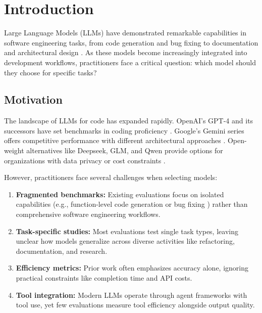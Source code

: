 \section{Introduction}
\label{sec:intro}

Large Language Models (LLMs) have demonstrated remarkable capabilities in software engineering tasks, from code generation and bug fixing to documentation and architectural design \cite{chen2021evaluating, jimenez2023swe}. As these models become increasingly integrated into development workflows, practitioners face a critical question: which model should they choose for specific tasks?

\subsection{Motivation}

The landscape of LLMs for code has expanded rapidly. OpenAI's GPT-4 and its successors have set benchmarks in coding proficiency \cite{openai2024gpt4}. Google's Gemini series offers competitive performance with different architectural approaches \cite{gemini2024}. Open-weight alternatives like Deepseek, GLM, and Qwen provide options for organizations with data privacy or cost constraints \cite{deepseek2024, glm2024, qwen2024}.

However, practitioners face several challenges when selecting models:

\begin{enumerate}
    \item \textbf{Fragmented benchmarks:} Existing evaluations focus on isolated capabilities (e.g., function-level code generation \cite{chen2021evaluating} or bug fixing \cite{jimenez2023swe}) rather than comprehensive software engineering workflows.
    
    \item \textbf{Task-specific studies:} Most evaluations test single task types, leaving unclear how models generalize across diverse activities like refactoring, documentation, and research.
    
    \item \textbf{Efficiency metrics:} Prior work often emphasizes accuracy alone, ignoring practical constraints like completion time and API costs.
    
    \item \textbf{Tool integration:} Modern LLMs operate through agent frameworks with tool use, yet few evaluations measure tool efficiency alongside output quality.
\end{enumerate}

